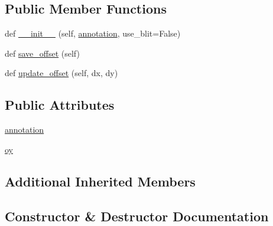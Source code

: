 \subsection*{Public Member Functions}
\begin{DoxyCompactItemize}
\item 
def \hyperlink{classmatplotlib_1_1offsetbox_1_1DraggableAnnotation_af275fd88bee7653fed78158e572b7f3e}{\+\_\+\+\_\+init\+\_\+\+\_\+} (self, \hyperlink{classmatplotlib_1_1offsetbox_1_1DraggableAnnotation_af4290c966cfe6d4c85df234cc9874c5e}{annotation}, use\+\_\+blit=False)
\item 
def \hyperlink{classmatplotlib_1_1offsetbox_1_1DraggableAnnotation_ac689dea7887423bb6299a12e08c1c8e8}{save\+\_\+offset} (self)
\item 
def \hyperlink{classmatplotlib_1_1offsetbox_1_1DraggableAnnotation_a8fceb3c75d7d1ed6831bbca944f0e8cd}{update\+\_\+offset} (self, dx, dy)
\end{DoxyCompactItemize}
\subsection*{Public Attributes}
\begin{DoxyCompactItemize}
\item 
\hyperlink{classmatplotlib_1_1offsetbox_1_1DraggableAnnotation_af4290c966cfe6d4c85df234cc9874c5e}{annotation}
\item 
\hyperlink{classmatplotlib_1_1offsetbox_1_1DraggableAnnotation_a577a0837f5aab9802bb2a6dc3e37843c}{oy}
\end{DoxyCompactItemize}
\subsection*{Additional Inherited Members}


\subsection{Constructor \& Destructor Documentation}
\mbox{\label{classmatplotlib_1_1offsetbox_1_1DraggableAnnotation_af275fd88bee7653fed78158e572b7f3e}} 
